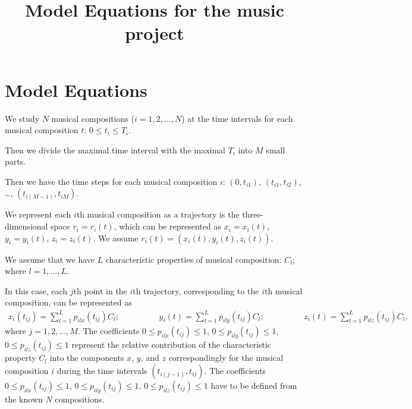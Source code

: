 \documentclass[preprintnumbers,amsmath,amssymb]{revtex4}
\begin{document}
\title{Model Equations for the music project}

\author{}








 \maketitle

\section{Model Equations}


We study $N$ musical compositions ($i = 1,2, \ldots, N$) at the time
intervals for each musical composition $t$: $0  \leq t_{i} \leq
T_{i}$.

Then we divide the maximal time interval with the maximal $T_{i}$
into $M$ small parts.

Then we have the time steps for each musical composition $i$: $(0,
t_{i1})$, $(t_{i1}, t_{i2})$, \ldots,  $(t_{i(M-1)}, t_{iM})$.

We represent each $i$th musical composition as a trajectory is the
three-dimensional space $r_{i} = r_{i}(t)$, which can be represented as $x_{i} =
x_{i}(t)$, $y_{i} = y_{i}(t)$, $z_{i} = z_{i}(t)$. We assume $r_{i}(t) = (x_{i}(t), y_{i}(t),
z_{i}(t))$.

We assume that we have $L$ characteristic properties of musical composition: $C_{l}$; where $l =
1, \ldots, L$.

In this case, each $j$th point in the $i$th trajectory, corresponding to the $i$th
musical composition, can be represented as
\begin{eqnarray}
\label{traj} x_{i}(t_{ij}) = \sum_{l = 1}^{L} p_{ilx}(t_{ij}) C_{l}; \hspace{2cm} y_{i}(t) = \sum_{l = 1}^{L} p_{ily}(t_{ij}) C_{l};
 \hspace{2cm} z_{i}(t) = \sum_{l = 1}^{L} p_{ilz}(t_{ij}) C_{l} ,
\end{eqnarray}
where $j = 1,2, \ldots, M$. The coefficients $0 \leq p_{ilx}(t_{ij}) \leq 1$, $0 \leq p_{ily}(t_{ij}) \leq 1$, $0 \leq p_{ilz}(t_{ij}) \leq 1$ represent
the relative contribution of the characteristic property $C_{l}$ into the components $x$, $y$, and $z$ correspondingly for the musical composition $i$ during the time intervals
$(t_{i(j-1)}, t_{ij})$. The coefficients $0 \leq p_{ilx}(t_{ij}) \leq 1$, $0 \leq p_{ily}(t_{ij}) \leq 1$, $0 \leq p_{ilz}(t_{ij}) \leq 1$ have to be defined
from the known $N$ compositions.
\end{document}
